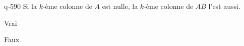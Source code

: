 \begin{truefalse}{q-590}
Si la $k$-ème colonne de $A$ est nulle, la $k$-ème colonne de $AB$ l'est aussi.
\item Vrai
\item* Faux
\end{truefalse}

